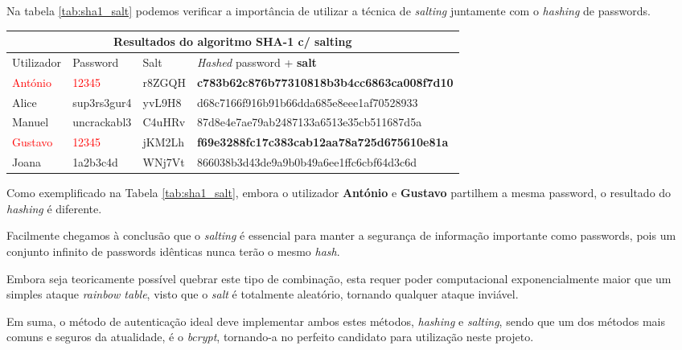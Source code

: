 Na tabela \ref{tab:sha1_salt} podemos verificar a importância de utilizar a técnica de \emph{salting} juntamente com o \emph{hashing} de passwords.

\begin{center}
    \begin{tabular}{ |p{1.7cm}|p{2cm}|p{1.5cm}|p{8cm}|  }
        \hline
        \multicolumn{4}{|c|}{Resultados do algoritmo SHA-1 c/ salting} \\
        \hline
        Utilizador & Password & Salt &\emph{Hashed} password + \textbf{salt}\\
        \hline 
        \textcolor{red}{António} & \textcolor{red}{12345} & r8ZGQH & \textbf{c783b62c876b77310818b3b4cc6863ca008f7d10}\\
        Alice & sup3rs3gur4 & yvL9H8 & d68c7166f916b91b66dda685e8eee1af70528933\\
        Manuel & uncrackabl3 & C4uHRv & 87d8e4e7ae79ab2487133a6513e35cb511687d5a\\
        \textcolor{red}{Gustavo} & \textcolor{red}{12345} & jKM2Lh & \textbf{f69e3288fc17c383cab12aa78a725d675610e81a}\\
        Joana & 1a2b3c4d & WNj7Vt & 866038b3d43de9a9b0b49a6ee1ffc6cbf64d3c6d\\
        \hline
    \end{tabular}
\label{tab:sha1_salt} 
\end{center}

Como exemplificado na Tabela \ref{tab:sha1_salt}, embora o utilizador \textbf{António} e \textbf{Gustavo} partilhem a mesma password, o resultado do \emph{hashing} é diferente.

Facilmente chegamos à conclusão que o \emph{salting} é essencial para manter a segurança de informação importante como passwords, pois um conjunto infinito de passwords idênticas nunca terão o mesmo \emph{hash}.

Embora seja teoricamente possível quebrar este tipo de combinação, esta requer poder computacional exponencialmente maior que um simples ataque \emph{rainbow table}, visto que o \emph{salt} é totalmente aleatório, tornando qualquer ataque inviável.

Em suma, o método de autenticação ideal deve implementar ambos estes métodos\cite{contini2015method}, \emph{hashing} e \emph{salting}, sendo que um dos métodos mais comuns e seguros da atualidade, é o \emph{bcrypt}, tornando-a no perfeito candidato para utilização neste projeto.


